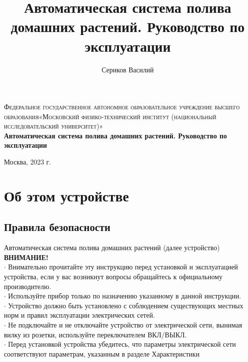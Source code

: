 \documentclass[12pt]{article}
\title{Автоматическая система полива домашних растений. Руководство по эксплуатации}
\author{Сериков Василий}
\begin{document}
	\begin{titlepage}
		\begin{center}
			\textsc{Федеральное государственное автономное образовательное учреждение высшего образования«Московский физико-технический институт (национальный исследовательский университет)»\\[5mm]
			}
			\vfill
			\textbf{Автоматическая система полива домашних растений. Руководство по эксплуатации}
			
		\end{center}
	
	\vfill
	\begin{center}
		Москва, 2023 г.
	\end{center}
	\end{titlepage}
	
	\tableofcontents
	
	\clearpage
	\newpage
	
	\section{Об этом устройстве}
	\subsection{Правила безопасности}
	
	Автоматическая система полива домашних растений (далее устройство)\\
	
	\textbf{ВНИМАНИЕ!}\\
	
	$\cdot$ Внимательно прочитайте эту инструкцию перед установкой и эксплуатацией устройства, если у вас возникнут вопросы обращайтесь
	к официальному производителю. \\
	
	$\cdot$ Используйте прибор только по назначению
	указанному в данной инструкции.\\
	
	$\cdot$ Устройство должно быть установлено с соблюдением
	существующих местных норм и правил эксплуатации
	электрических сетей.\\
	
	$\cdot$ Не подключайте и не отключайте устройство
	от электрической сети, вынимая вилку из розетки, используйте переключателем ВКЛ/ВЫКЛ.\\
	
	$\cdot$ Перед установкой устройства убедитесь,
	что параметры электрической сети
	соответствуют параметрам, указанным в разделе Характеристики \\
	
\end{document}
